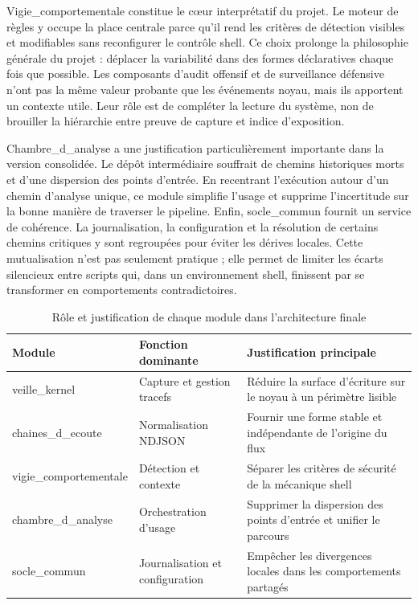 \documentclass[12pt,a4paper]{report}
\begin{document}
Vigie\_comportementale constitue le cœur interprétatif du projet. Le moteur de règles y occupe la place centrale parce qu’il rend les critères de détection visibles et modifiables sans reconfigurer le contrôle shell. Ce choix prolonge la philosophie générale du projet : déplacer la variabilité dans des formes déclaratives chaque fois que possible. Les composants d’audit offensif et de surveillance défensive n’ont pas la même valeur probante que les événements noyau, mais ils apportent un contexte utile. Leur rôle est de compléter la lecture du système, non de brouiller la hiérarchie entre preuve de capture et indice d’exposition.

Chambre\_d\_analyse a une justification particulièrement importante dans la version consolidée. Le dépôt intermédiaire souffrait de chemins historiques morts et d’une dispersion des points d’entrée. En recentrant l’exécution autour d’un chemin d’analyse unique, ce module simplifie l’usage et supprime l’incertitude sur la bonne manière de traverser le pipeline. Enfin, socle\_commun fournit un service de cohérence. La journalisation, la configuration et la résolution de certains chemins critiques y sont regroupées pour éviter les dérives locales. Cette mutualisation n’est pas seulement pratique ; elle permet de limiter les écarts silencieux entre scripts qui, dans un environnement shell, finissent par se transformer en comportements contradictoires.

\begin{table}[h]
\centering
\begin{tabular}{>{\raggedright\arraybackslash}p{4cm} >{\raggedright\arraybackslash}p{3.6cm} >{\raggedright\arraybackslash}p{5.7cm}}
\toprule
Module & Fonction dominante & Justification principale \\
\midrule
veille\_kernel & Capture et gestion tracefs & Réduire la surface d’écriture sur le noyau à un périmètre lisible \\
chaines\_d\_ecoute & Normalisation NDJSON & Fournir une forme stable et indépendante de l’origine du flux \\
vigie\_comportementale & Détection et contexte & Séparer les critères de sécurité de la mécanique shell \\
chambre\_d\_analyse & Orchestration d’usage & Supprimer la dispersion des points d’entrée et unifier le parcours \\
socle\_commun & Journalisation et configuration & Empêcher les divergences locales dans les comportements partagés \\
\bottomrule
\end{tabular}
\caption{Rôle et justification de chaque module dans l’architecture finale}
\end{table}
\end{document}
